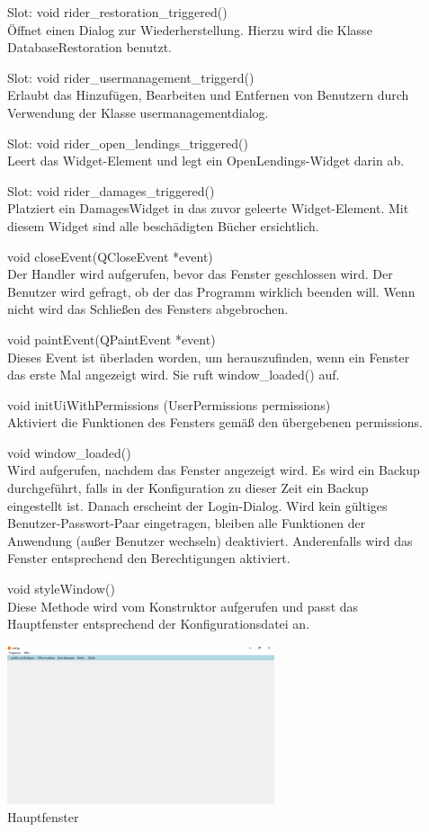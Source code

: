 \begin{description}
  \item[ ] Slot: void rider\_restoration\_triggered()\\
	Öffnet einen Dialog zur Wiederherstellung. Hierzu wird die Klasse DatabaseRestoration benutzt.
  \item[ ] Slot: void rider\_usermanagement\_triggerd()\\
	Erlaubt das Hinzufügen, Bearbeiten und Entfernen von Benutzern durch Verwendung der Klasse usermanagementdialog.
  \item[ ] Slot: void rider\_open\_lendings\_triggered()\\
	Leert das Widget-Element und legt ein OpenLendings-Widget darin ab.
  \item[ ] Slot: void rider\_damages\_triggered()\\
	Platziert ein DamagesWidget in das zuvor geleerte Widget-Element. Mit diesem Widget sind alle beschädigten Bücher ersichtlich.
	\item[ ] void closeEvent(QCloseEvent *event)\\
	Der Handler wird aufgerufen, bevor das Fenster geschlossen wird. Der Benutzer wird gefragt, ob der das Programm wirklich beenden will. Wenn nicht wird das Schließen des Fensters abgebrochen.
  \item[ ] void paintEvent(QPaintEvent *event)\\
  Dieses Event ist überladen worden, um herauszufinden, wenn ein Fenster das erste Mal angezeigt wird. Sie ruft window\_loaded() auf.
	\item[ ] void initUiWithPermissions (UserPermissions permissions)\\
	Aktiviert die Funktionen des Fensters gemäß den übergebenen permissions.
	\item[ ] void window\_loaded()\\
	Wird aufgerufen, nachdem das Fenster angezeigt wird. Es wird ein Backup durchgeführt, falls in der Konfiguration zu dieser Zeit ein Backup eingestellt ist. Danach erscheint der Login-Dialog. Wird kein gültiges Benutzer-Passwort-Paar eingetragen, bleiben alle Funktionen der Anwendung (außer Benutzer wechseln) deaktiviert. Anderenfalls wird das Fenster entsprechend den Berechtigungen aktiviert.
	\item[ ] void styleWindow()\\
	Diese Methode wird vom Konstruktor aufgerufen und passt das Hauptfenster entsprechend der Konfigurationsdatei an.
\end{description}
\begin{figure}[htb]
	\centering
		\includegraphics[width=0.70\textwidth]{figures/MainWindow.png}
	\caption{Hauptfenster}
	\label{fig:MainWindow}
\end{figure}
